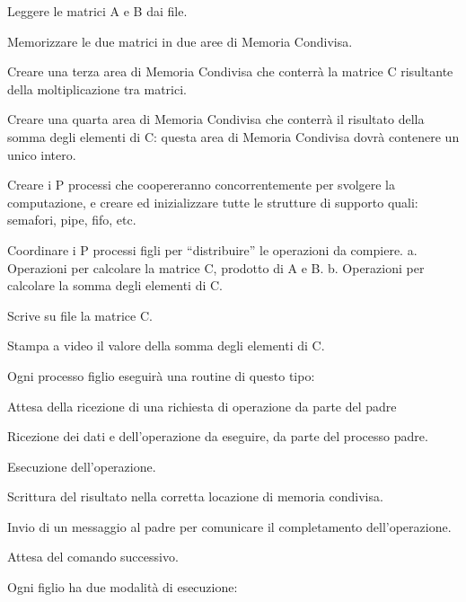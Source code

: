 \begin{DoxyEnumerate}
\item Leggere le matrici A e B dai file.
\item Memorizzare le due matrici in due aree di Memoria Condivisa.
\item Creare una terza area di Memoria Condivisa che conterrà la matrice C risultante della moltiplicazione tra matrici.
\item Creare una quarta area di Memoria Condivisa che conterrà il risultato della somma degli elementi di C\+: questa area di Memoria Condivisa dovrà contenere un unico intero.
\item Creare i P processi che coopereranno concorrentemente per svolgere la computazione, e creare ed inizializzare tutte le strutture di supporto quali\+: semafori, pipe, fifo, etc.
\item Coordinare i P processi figli per “distribuire” le operazioni da compiere. a. Operazioni per calcolare la matrice C, prodotto di A e B. b. Operazioni per calcolare la somma degli elementi di C.
\item Scrive su file la matrice C.
\item Stampa a video il valore della somma degli elementi di C.
\end{DoxyEnumerate}

Ogni processo figlio eseguirà una routine di questo tipo\+:


\begin{DoxyEnumerate}
\item Attesa della ricezione di una richiesta di operazione da parte del padre
\item Ricezione dei dati e dell’operazione da eseguire, da parte del processo padre.
\item Esecuzione dell’operazione.
\item Scrittura del risultato nella corretta locazione di memoria condivisa.
\item Invio di un messaggio al padre per comunicare il completamento dell’operazione.
\item Attesa del comando successivo.
\end{DoxyEnumerate}

Ogni figlio ha due modalità di esecuzione\+:


